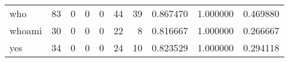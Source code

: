 \begin{longtable}{lrrrrrrrrr}
who       &                                        83 &                                                  0 &                                                  0 &                                                  0 &                                                 44 &                                                 39 &                                           0.867470 &                               1.000000 &                             0.469880 \\
whoami    &                                        30 &                                                  0 &                                                  0 &                                                  0 &                                                 22 &                                                  8 &                                           0.816667 &                               1.000000 &                             0.266667 \\
yes       &                                        34 &                                                  0 &                                                  0 &                                                  0 &                                                 24 &                                                 10 &                                           0.823529 &                               1.000000 &                             0.294118 \\
\end{longtable}
